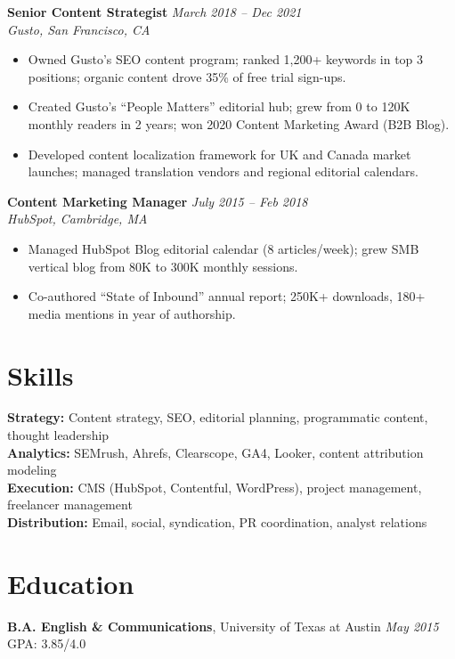 \documentclass[11pt,a4paper]{article}
\begin{document}
\vspace{4pt}
\noindent\textbf{Senior Content Strategist} \hfill \textit{March 2018 -- Dec 2021}\\
\textit{Gusto, San Francisco, CA}
\begin{itemize}
  \item Owned Gusto's SEO content program; ranked 1,200+ keywords in top 3 positions; organic content drove 35\% of free trial sign-ups.
  \item Created Gusto's ``People Matters'' editorial hub; grew from 0 to 120K monthly readers in 2 years; won 2020 Content Marketing Award (B2B Blog).
  \item Developed content localization framework for UK and Canada market launches; managed translation vendors and regional editorial calendars.
\end{itemize}

\vspace{4pt}
\noindent\textbf{Content Marketing Manager} \hfill \textit{July 2015 -- Feb 2018}\\
\textit{HubSpot, Cambridge, MA}
\begin{itemize}
  \item Managed HubSpot Blog editorial calendar (8 articles/week); grew SMB vertical blog from 80K to 300K monthly sessions.
  \item Co-authored ``State of Inbound'' annual report; 250K+ downloads, 180+ media mentions in year of authorship.
\end{itemize}

\section{Skills}
\textbf{Strategy:} Content strategy, SEO, editorial planning, programmatic content, thought leadership\\
\textbf{Analytics:} SEMrush, Ahrefs, Clearscope, GA4, Looker, content attribution modeling\\
\textbf{Execution:} CMS (HubSpot, Contentful, WordPress), project management, freelancer management\\
\textbf{Distribution:} Email, social, syndication, PR coordination, analyst relations

\section{Education}
\textbf{B.A. English \& Communications}, University of Texas at Austin \hfill \textit{May 2015} \quad GPA: 3.85/4.0
\end{document}
